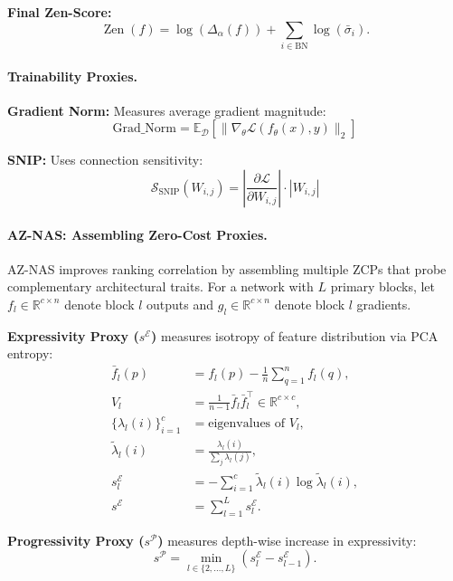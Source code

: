 \textbf{Final Zen-Score:}
\begin{equation}\label{eq:zen}
	\operatorname{Zen}(f) = \log( \Delta_\alpha(f) ) + \sum_{i\in\mathrm{BN}} \log(\bar{\sigma}_i).
\end{equation}

\paragraph{Trainability Proxies.}

\textbf{Gradient Norm:} Measures average gradient magnitude:
\begin{equation}
	\text{Grad\_Norm} = \mathbb{E}_{\mathcal{D}}\left[\|\nabla_\theta \mathcal{L}(f_\theta(x), y)\|_2\right]
\end{equation}

\textbf{SNIP:} Uses connection sensitivity:
\begin{equation}
	\mathcal{S}_{\text{SNIP}}(W_{i,j}) = \left|\frac{\partial \mathcal{L}}{\partial W_{i,j}}\right| \cdot |W_{i,j}|
\end{equation}

\paragraph{AZ-NAS: Assembling Zero-Cost Proxies.}
AZ-NAS \cite{abdelfattah2021zero} improves ranking correlation by assembling multiple ZCPs that probe complementary architectural traits. For a network with $L$ primary blocks, let $f_l \in \mathbb{R}^{c \times n}$ denote block $l$ outputs and $g_l \in \mathbb{R}^{c \times n}$ denote block $l$ gradients.

\textbf{Expressivity Proxy ($s^{\mathcal{E}}$)} measures isotropy of feature distribution via PCA entropy:
\begin{align}
	\bar f_l(p) &= f_l(p) - \frac{1}{n}\sum_{q=1}^n f_l(q),\\
	V_l &= \frac{1}{n-1}\bar f_l\bar f_l^\top \in\mathbb{R}^{c\times c},\\
	\{\lambda_l(i)\}_{i=1}^c &= \text{eigenvalues of }V_l,\\
	\tilde\lambda_l(i) &= \frac{\lambda_l(i)}{\sum_{j}\lambda_l(j)},\\
	s_l^{\mathcal{E}} &= -\sum_{i=1}^c \tilde\lambda_l(i)\log\tilde\lambda_l(i),\\
	s^{\mathcal{E}} &= \sum_{l=1}^L s_l^{\mathcal{E}}.
\end{align}

\textbf{Progressivity Proxy ($s^{\mathcal{P}}$)} measures depth-wise increase in expressivity:
\begin{equation}
	s^{\mathcal{P}}=\min_{l\in\{2,\ldots,L\}} \left( s^{\mathcal{E}}_{l} - s^{\mathcal{E}}_{l-1} \right).
\end{equation}

